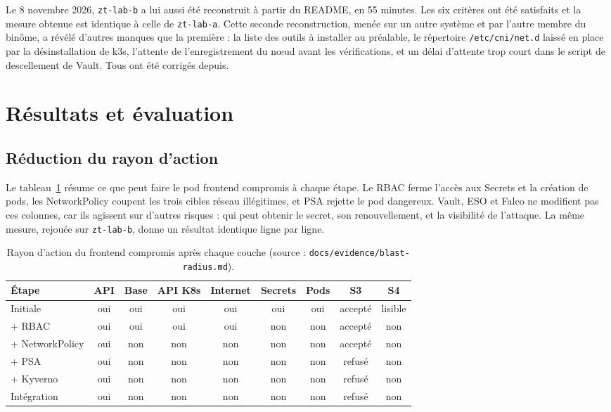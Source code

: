 \documentclass[11pt,a4paper]{article}
\newcommand{\code}[1]{\texttt{#1}}
\begin{document}
Le 8 novembre 2026, \code{zt-lab-b} a lui aussi été reconstruit à partir du README, en 55 minutes. Les six critères ont été satisfaits et la mesure obtenue est identique à celle de \code{zt-lab-a}. Cette seconde reconstruction, menée sur un autre système et par l'autre membre du binôme, a révélé d'autres manques que la première : la liste des outils à installer au préalable, le répertoire \code{/etc/cni/net.d} laissé en place par la désinstallation de k3s, l'attente de l'enregistrement du nœud avant les vérifications, et un délai d'attente trop court dans le script de descellement de Vault. Tous ont été corrigés depuis.

\section{Résultats et évaluation}

\subsection{Réduction du rayon d'action}

Le tableau~\ref{tab:blast} résume ce que peut faire le pod frontend compromis à chaque étape. Le RBAC ferme l'accès aux Secrets et la création de pods, les NetworkPolicy coupent les trois cibles réseau illégitimes, et PSA rejette le pod dangereux. Vault, ESO et Falco ne modifient pas ces colonnes, car ils agissent sur d'autres risques : qui peut obtenir le secret, son renouvellement, et la visibilité de l'attaque. La même mesure, rejouée sur \code{zt-lab-b}, donne un résultat identique ligne par ligne.

\begin{table}[H]
\centering
\caption{Rayon d'action du frontend compromis après chaque couche (source : \code{docs/evidence/blast-radius.md}).}
\label{tab:blast}
\small
\begin{tabular}{@{}lcccccccc@{}}
\toprule
\textbf{Étape} & \textbf{API} & \textbf{Base} & \textbf{API K8s} & \textbf{Internet} & \textbf{Secrets} & \textbf{Pods} & \textbf{S3} & \textbf{S4} \\
\midrule
Initiale       & oui & oui & oui & oui & oui & oui & accepté & lisible \\
+ RBAC         & oui & oui & oui & oui & non & non & accepté & non \\
+ NetworkPolicy& oui & non & non & non & non & non & accepté & non \\
+ PSA          & oui & non & non & non & non & non & refusé & non \\
+ Kyverno      & oui & non & non & non & non & non & refusé & non \\
Intégration    & oui & non & non & non & non & non & refusé & non \\
\bottomrule
\end{tabular}
\end{table}
\end{document}
